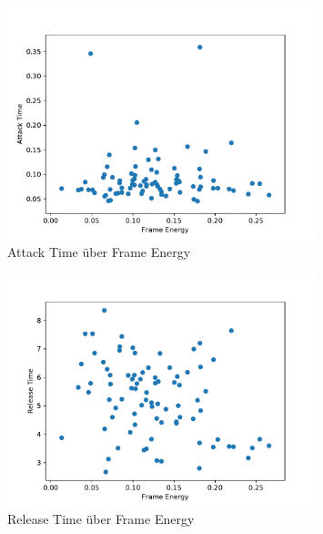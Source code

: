 \begin{figure}[H]
    \center
    \includegraphics[width = 0.8\textwidth]{Figures/att.pdf}
    \caption{Attack Time über Frame Energy}
    \label{fig:attack_time}
\end{figure}

\begin{figure}[H]
    \center
    \includegraphics[width = 0.8\textwidth]{Figures/rel.pdf}
    \caption{Release Time über Frame Energy}
    \label{fig:release_time}
\end{figure}

